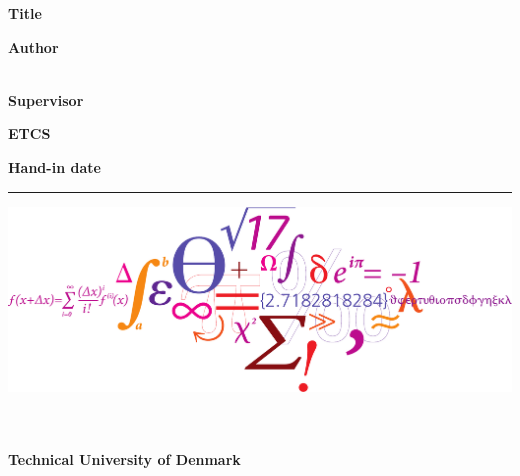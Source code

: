 \begin{spacing}{1}
    
    \textbf{Title}\\
    \thesistitle
    
    \textbf{Author}\\
    \thesisauthor\\
    \studentnumber
    
    \textbf{Supervisor}\\
    \thesissupervisor
    
    \textbf{ETCS}\\
    \thesisetcs
    
    \textbf{Hand-in date}\\
    \thedate
    
    \vspace{2.5cm}

    \vspace{0.05cm}
    \hrule width 7cm \relax
    \thesisauthor

    \vspace*{-16ex}

    \begin{centering}
        \includegraphics[width=1.9\textwidth]{frontmatter/front_gfx/dtu_frise.pdf}
    \end{centering}
    
    \vspace*{-10ex}
   
    
    {
    \raggedleft
    \small
    \textbf{\department\\\departmentdescriber\\Technical University of Denmark\\}
    \vspace{1em}
    \addressI\\\addressII\\\addressIII\\\departmentemail\\\departmentwebsite\\
    }
    
\end{spacing}

\newpage
